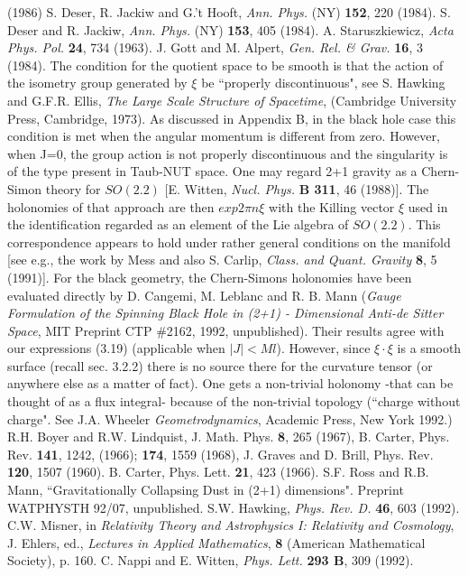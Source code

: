 \documentclass[12pt]{article}
\newcounter{c1} \newcounter{c2}
\begin{document}
\begin{thebibliography}{20}
 (1986)
S. Deser, R. Jackiw and G.'t Hooft, {\it Ann. Phys.} (NY)
{\bf 152},
 220 (1984). S. Deser and R. Jackiw, {\it Ann. Phys.} (NY) {\bf 153}, 405
 (1984). A. Staruszkiewicz, {\it Acta Phys. Pol.} {\bf 24}, 734 (1963).
J. Gott and M. Alpert, {\it Gen. Rel. \& Grav.} {\bf 16}, 3 (1984).
The condition for the quotient space to be smooth is that the
action
 of the isometry group generated by $\xi$ be ``properly discontinuous", see S.
 Hawking and G.F.R. Ellis, {\it The Large Scale Structure of Spacetime},
 (Cambridge University Press, Cambridge, 1973). As discussed in Appendix B, in
 the black hole case this condition is met when the angular momentum is
 different from zero. However, when J=0, the group action is not properly
 discontinuous and the singularity is of the type present in Taub-NUT space.
One may regard 2+1 gravity as a Chern-Simon theory for $SO (2.2)$
[E. Witten, {\it Nucl. Phys.} {\bf B 311}, 46 (1988)]. The holonomies of that
 approach are then $exp 2 \pi n \xi$ with the Killing vector $\xi$ used in the
 identification regarded as an element of the Lie algebra of $SO(2.2)$. This
 correspondence appears to hold under rather general conditions on the
manifold
 [see e.g., the work by Mess\cite{4} and also S. Carlip, {\it Class. and
Quant. Gravity} {\bf 8}, 5 (1991)]. For the black geometry, the Chern-Simons
 holonomies have been evaluated directly by D. Cangemi, M. Leblanc and R. B.
 Mann ({\it Gauge Formulation of the Spinning Black Hole in (2+1) -
Dimensional
 Anti-de Sitter Space}, MIT Preprint CTP \#2162, 1992, unpublished). Their
 results agree with our expressions (3.19) (applicable when $ \vert J \vert <
Ml$).  However, since $\xi \cdot \xi$ is a smooth surface (recall sec.
3.2.2) there is no source there for the curvature tensor (or anywhere else
as a matter of fact).  One gets a non-trivial holonomy  -that can be thought
of as a flux integral- because of the non-trivial topology
(``charge without charge".  See J.A. Wheeler {\it
Geometrodynamics}, Academic Press, New York 1992.)
R.H. Boyer and R.W. Lindquist, J. Math. Phys. {\bf 8}, 265 (1967),
B.
 Carter, Phys. Rev. {\bf 141}, 1242, (1966); {\bf 174}, 1559 (1968), J. Graves
 and D. Brill, Phys. Rev. {\bf 120}, 1507 (1960).
B. Carter, Phys. Lett. {\bf 21}, 423 (1966).
 S.F. Ross and R.B. Mann, ``Gravitationally Collapsing Dust in
(2+1) dimensions". Preprint WATPHYSTH 92/07, unpublished.
 S.W. Hawking, {\it Phys. Rev. D.} {\bf 46}, 603 (1992).
C.W. Misner, in {\it Relativity Theory and Astrophysics I:
Relativity
 and Cosmology}, J. Ehlers, ed., {\it Lectures in Applied Mathematics},
{\bf 8}
 (American Mathematical Society), p. 160.
C. Nappi and E. Witten, {\it Phys. Lett.} {\bf 293 B}, 309 (1992).


\end{thebibliography}
\end{document}
